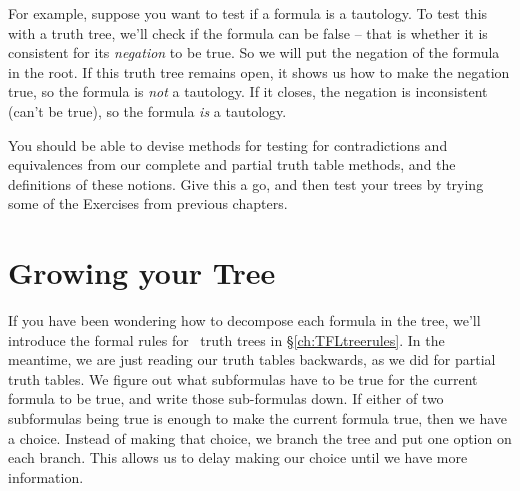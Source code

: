 \documentclass[PHIL101-Textbook.tex]{subfiles}
\begin{document}
For example, suppose you want to test if a formula is a tautology. To test this with a truth tree, we'll check if the formula can be false -- that is whether it is consistent for its \emph{negation} to be true. So we will put the negation of the formula in the root. If this truth tree remains open, it shows us how to make the negation true, so the formula is \emph{not} a tautology. If it closes, the negation is inconsistent (can't be true), so the formula \emph{is} a tautology.


You should be able to devise methods for testing for contradictions and equivalences from our complete and partial truth table methods, and the definitions of these notions. Give this a go, and then test your trees by trying some of the Exercises from previous chapters.





\section{Growing your Tree}
\label{sec.TFLinvalidtree}

If you have been wondering how to decompose each formula in the tree, we'll introduce the formal rules for \tfl\ truth trees in \S\ref{ch:TFLtreerules}. In the meantime, we are just reading our truth tables backwards, as we did for partial truth tables. We figure out what subformulas have to be true for the current formula to be true, and write those sub-formulas down. If either of two subformulas being true is enough to make the current formula true, then we have a choice. Instead of making that choice, we branch the tree and put one option on each branch. This allows us to delay making our choice until we have more information.
\end{document}
